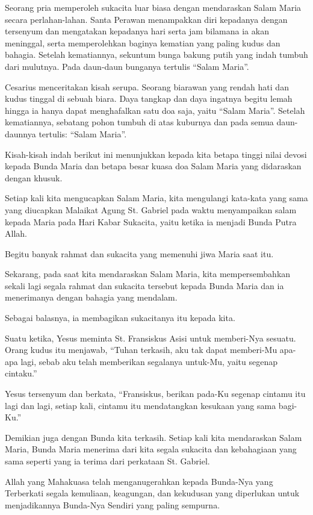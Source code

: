 Seorang pria memperoleh sukacita luar biasa dengan mendaraskan Salam Maria secara perlahan-lahan. Santa Perawan menampakkan diri kepadanya dengan tersenyum dan mengatakan kepadanya hari serta jam bilamana ia akan meninggal, serta memperolehkan baginya kematian yang paling kudus dan bahagia. Setelah kematiannya, sekuntum bunga bakung putih yang indah tumbuh dari mulutnya. Pada daun-daun bunganya tertulis “Salam Maria”.
 
Cesarius menceritakan kisah serupa. Seorang biarawan yang rendah hati dan kudus tinggal di sebuah biara. Daya tangkap dan daya ingatnya begitu lemah hingga ia hanya dapat menghafalkan satu doa saja, yaitu “Salam Maria”. Setelah kematiannya, sebatang pohon tumbuh di atas kuburnya dan pada semua daun-daunnya tertulis: “Salam Maria”.
 
Kisah-kisah indah berikut ini menunjukkan kepada kita betapa tinggi nilai devosi kepada Bunda Maria dan betapa besar kuasa doa Salam Maria yang didaraskan dengan khusuk.
 
Setiap kali kita mengucapkan Salam Maria, kita mengulangi kata-kata yang sama yang diucapkan Malaikat Agung St. Gabriel pada waktu menyampaikan salam kepada Maria pada Hari Kabar Sukacita, yaitu ketika ia menjadi Bunda Putra Allah.
 
Begitu banyak rahmat dan sukacita yang memenuhi jiwa Maria saat itu.
 
Sekarang, pada saat kita mendaraskan Salam Maria, kita mempersembahkan sekali lagi segala rahmat dan sukacita tersebut kepada Bunda Maria dan ia menerimanya dengan bahagia yang mendalam.
 
Sebagai balasnya, ia membagikan sukacitanya itu kepada kita.
 
Suatu ketika, Yesus meminta St. Fransiskus Asisi untuk memberi-Nya sesuatu. Orang kudus itu menjawab, “Tuhan terkasih, aku tak dapat memberi-Mu apa-apa lagi, sebab aku telah memberikan segalanya untuk-Mu, yaitu segenap cintaku.”
 
Yesus tersenyum dan berkata, “Fransiskus, berikan pada-Ku segenap cintamu itu lagi dan lagi, setiap kali, cintamu itu mendatangkan kesukaan yang sama bagi-Ku.”
 
Demikian juga dengan Bunda kita terkasih. Setiap kali kita mendaraskan Salam Maria, Bunda Maria menerima dari kita segala sukacita dan kebahagiaan yang sama seperti yang ia terima dari perkataan St. Gabriel.
 
Allah yang Mahakuasa telah menganugerahkan kepada Bunda-Nya yang Terberkati segala kemuliaan, keagungan, dan kekudusan yang diperlukan untuk menjadikannya Bunda-Nya Sendiri yang paling sempurna.
 
